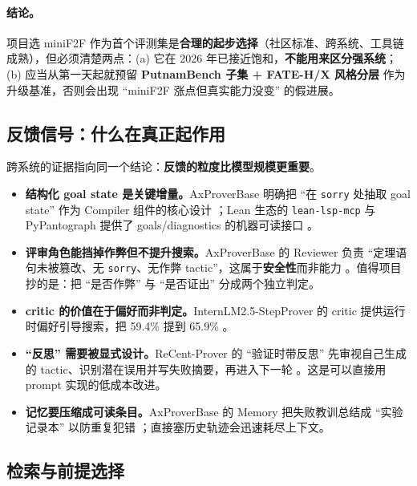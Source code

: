 \documentclass[UTF8,a4paper,11pt,fontset=windows]{ctexart}
\newcommand{\code}[1]{\texttt{#1}}
\begin{document}
\paragraph{结论。}项目选 miniF2F 作为首个评测集是\textbf{合理的起步选择}（社区标准、跨系统、工具链成熟），但必须清楚两点：(a) 它在 2026 年已接近饱和，\textbf{不能用来区分强系统}；(b) 应当从第一天起就预留 \textbf{PutnamBench 子集 + FATE-H/X 风格分层} 作为升级基准，否则会出现 ``miniF2F 涨点但真实能力没变'' 的假进展。

\subsection{反馈信号：什么在真正起作用}

跨系统的证据指向同一个结论：\textbf{反馈的粒度比模型规模更重要}。

\begin{itemize}
  \item \textbf{结构化 goal state 是关键增量。}AxProverBase 明确把 ``在 \code{sorry} 处抽取 goal state'' 作为 Compiler 组件的核心设计 \cite{axprover}；Lean 生态的 \code{lean-lsp-mcp} 与 PyPantograph 提供了 goals/diagnostics 的机器可读接口 \cite{pantograph}。
  \item \textbf{评审角色能挡掉作弊但不提升搜索。}AxProverBase 的 Reviewer 负责 ``定理语句未被篡改、无 \code{sorry}、无作弊 tactic''，这属于\textbf{安全性}而非能力 \cite{axprover}。值得项目抄的是：把 ``是否作弊'' 与 ``是否证出'' 分成两个独立判定。
  \item \textbf{critic 的价值在于偏好而非判定。}InternLM2.5-StepProver 的 critic 提供运行时偏好引导搜索，把 59.4\% 提到 65.9\% \cite{internlm}。
  \item \textbf{``反思'' 需要被显式设计。}ReCent-Prover 的 ``验证时带反思'' 先审视自己生成的 tactic、识别潜在误用并写失败摘要，再进入下一轮 \cite{recent}。这是可以直接用 prompt 实现的低成本改进。
  \item \textbf{记忆要压缩成可读条目。}AxProverBase 的 Memory 把失败教训总结成 ``实验记录本'' 以防重复犯错 \cite{axprover}；直接塞历史轨迹会迅速耗尽上下文。
\end{itemize}

\subsection{检索与前提选择}
\end{document}
